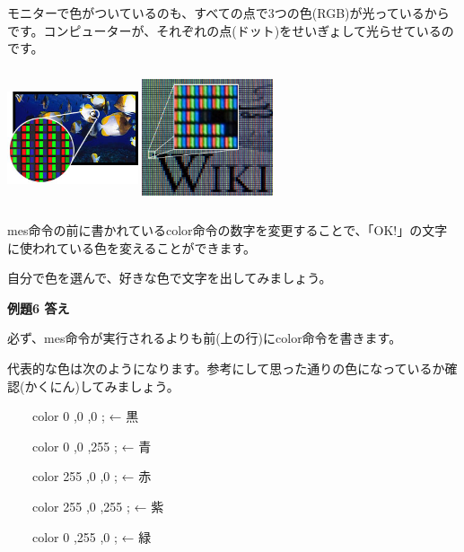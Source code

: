 \documentclass[a4paper,12pt]{jarticle}
\begin{document}
モニターで色がついているのも、すべての点で3つの色(RGB)が光っているからです。コンピューターが、それぞれの点(ドット)をせいぎょして光らせているのです。


\bigskip
\bigskip

\begin{minipage}{11.781cm}
\centering
{\upshape
\includegraphics[keepaspectratio,width=3.854cm,height=3.988cm]{text02-img/text02-img034.jpg}
\includegraphics[keepaspectratio,width=3.854cm,height=3.988cm]{text02-img/text02-img035.jpg}}
\end{minipage}

\bigskip
\bigskip
\bigskip

mes命令の前に書かれているcolor命令の数字を変更することで、「OK!」の文字に使われている色を変えることができます。

自分で色を選んで、好きな色で文字を出してみましょう。

\bigskip


\bigskip

{\bfseries
例題6 答え}


\bigskip

必ず、mes命令が実行されるよりも前(上の行)にcolor命令を書きます。

代表的な色は次のようになります。参考にして思った通りの色になっているか確認(かくにん)してみましょう。

\bigskip

\ \ \ \ color 0 ,0 ,0 ; ← 黒 

\ \ \ \ color 0 ,0 ,255 ; ← 青 

\ \ \ \ color 255 ,0 ,0 ; ← 赤 

\ \ \ \ color 255 ,0 ,255 ; ← 紫 

\ \ \ \ color 0 ,255 ,0 ; ← 緑 
\end{document}
